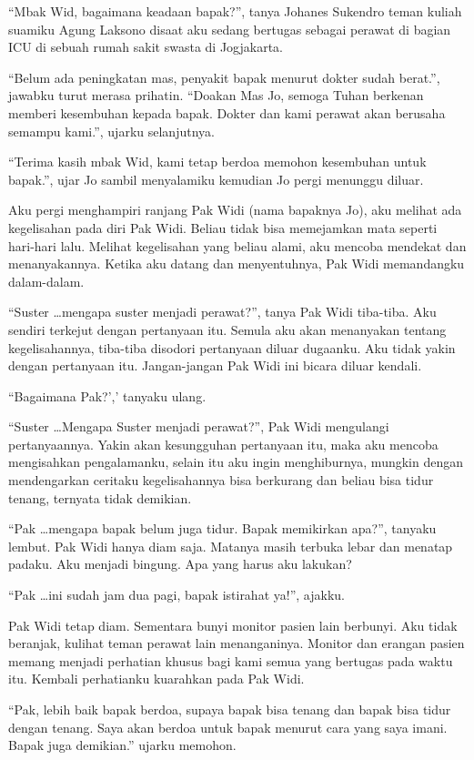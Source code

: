 \small
``Mbak Wid, bagaimana keadaan bapak?'', tanya Johanes Sukendro teman kuliah suamiku Agung Laksono disaat aku sedang bertugas sebagai perawat di bagian ICU di sebuah rumah sakit swasta di Jogjakarta. 

``Belum ada peningkatan mas, penyakit bapak menurut dokter sudah berat.'', jawabku turut merasa prihatin. ``Doakan Mas Jo, semoga Tuhan berkenan memberi  kesembuhan kepada bapak. Dokter dan kami perawat akan berusaha semampu kami.'', ujarku selanjutnya. 

``Terima kasih mbak Wid, kami tetap berdoa memohon kesembuhan untuk bapak.'', ujar Jo sambil menyalamiku kemudian Jo pergi menunggu diluar.

Aku pergi menghampiri ranjang Pak Widi (nama bapaknya Jo), aku melihat ada kegelisahan pada diri Pak Widi. Beliau tidak bisa memejamkan mata seperti hari-hari lalu. Melihat kegelisahan yang beliau alami, aku mencoba mendekat dan menanyakannya. Ketika aku datang dan menyentuhnya, Pak Widi memandangku dalam-dalam. 

``Suster \ldots mengapa suster menjadi perawat?'', tanya Pak Widi tiba-tiba. Aku sendiri terkejut dengan pertanyaan itu. Semula aku akan menanyakan tentang kegelisahannya, tiba-tiba disodori pertanyaan diluar dugaanku. Aku tidak yakin dengan pertanyaan itu. Jangan-jangan Pak Widi ini bicara diluar kendali.

``Bagaimana Pak?',' tanyaku ulang.

``Suster \ldots Mengapa Suster menjadi perawat?'', Pak Widi mengulangi pertanyaannya. Yakin akan kesungguhan pertanyaan itu, maka aku mencoba mengisahkan pengalamanku, selain itu aku ingin menghiburnya, mungkin dengan mendengarkan ceritaku kegelisahannya bisa berkurang dan beliau bisa tidur tenang, ternyata tidak demikian.

``Pak \ldots mengapa bapak belum juga tidur. Bapak memikirkan apa?'', tanyaku lembut.
Pak Widi hanya diam saja. Matanya masih terbuka lebar dan menatap padaku. Aku menjadi bingung. Apa yang harus aku lakukan?

``Pak \ldots ini sudah jam dua pagi, bapak istirahat ya!'', ajakku.

Pak Widi tetap diam. Sementara bunyi monitor pasien lain berbunyi. Aku tidak beranjak, kulihat teman perawat lain menanganinya. Monitor dan erangan pasien memang menjadi perhatian khusus bagi kami semua yang bertugas pada waktu itu.
Kembali perhatianku kuarahkan pada Pak Widi.

``Pak, lebih baik bapak berdoa, supaya bapak bisa tenang dan bapak bisa tidur dengan tenang. Saya akan berdoa untuk bapak menurut cara yang saya imani. Bapak juga demikian.'' ujarku memohon.

